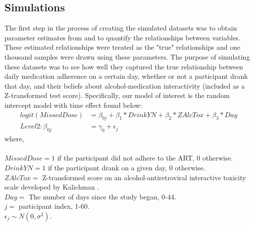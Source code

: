 \documentclass{svjour3}\usepackage[]{graphicx}\usepackage[]{color}
\begin{document}
\subsection{Simulations}
\label{sec:2.2}
The first step in the process of creating the simulated datasets was to obtain parameter estimates from \citet{pellowski2016alcohol} and to quantify the relationships between variables. These estimated relationships were treated as the "true" relationships and one thousand samples were drawn using these parameters. The purpose of simulating these datasets was to see how well they captured the true relationship between daily medication adherence on a certain day, whether or not a participant drank that day, and their beliefs about alcohol-medication interactivity (included as a Z-transformed test score). Specifically, our model of interest is the random intercept model with time effect found below: \\

\begin{align*}
logit(MissedDose) &= \beta_{0j} + \beta_1*DrinkYN + \beta_2*ZAlcTox +\beta_3*Day \\
Level 2: \beta_{0j} &= \gamma_0 + \epsilon_j
\end{align*}
where, \\ \\
$MissedDose = 1$ if the participant did not adhere to the ART, 0 otherwise. \\
$DrinkYN = 1$ if the participant drank on a given day, 0 otherwise.\\
$ZAlcTox =$ Z-transformed score on an alcohol-antiretroviral interactive toxicity scale developed by Kalichman \cite{kalichman2009prevalence}. \\
$Day =$ The number of days since the study began, 0-44. \\
$j =$ participant index, 1-60. \\
$\epsilon_j  \sim N(0, \sigma^2)$. \\ \\
\end{document}

